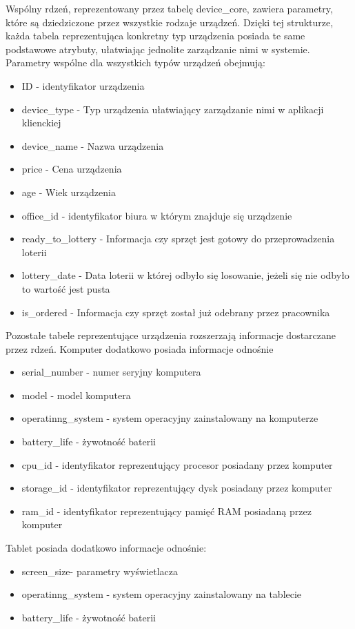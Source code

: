 Wspólny rdzeń, reprezentowany przez tabelę device\_core, zawiera parametry, które są dziedziczone przez wszystkie rodzaje urządzeń. Dzięki tej strukturze, każda tabela reprezentująca konkretny typ urządzenia posiada te same podstawowe atrybuty, ułatwiając jednolite zarządzanie nimi w systemie. Parametry wspólne dla wszystkich typów urządzeń obejmują:
\begin{itemize}
	\item ID - identyfikator urządzenia
	\item device\_type - Typ urządzenia ułatwiający zarządzanie nimi w aplikacji klienckiej
	\item device\_name - Nazwa urządzenia
	\item price - Cena urządzenia
	\item age - Wiek urządzenia
	\item office\_id - identyfikator biura w którym znajduje się urządzenie
	\item ready\_to\_lottery - Informacja czy sprzęt jest gotowy do przeprowadzenia loterii
	\item lottery\_date - Data loterii w której odbyło się losowanie, jeżeli się nie odbyło to wartość jest pusta
	\item is\_ordered - Informacja czy sprzęt został już odebrany przez pracownika
\end{itemize}

Pozostałe tabele reprezentujące urządzenia rozszerzają informacje dostarczane przez rdzeń. Komputer dodatkowo posiada informacje odnośnie
\begin{itemize}
	\item serial\_number - numer seryjny komputera
	\item model - model komputera
	\item operatinng\_system - system operacyjny zainstalowany na komputerze
	\item battery\_life - żywotność baterii
	\item cpu\_id - identyfikator reprezentujący procesor posiadany przez komputer
	\item storage\_id - identyfikator reprezentujący dysk posiadany przez komputer
	\item ram\_id - identyfikator reprezentujący pamięć RAM posiadaną przez komputer
\end{itemize}

Tablet posiada dodatkowo informacje odnośnie:
\begin{itemize}
	\item screen\_size- parametry wyświetlacza
	\item operatinng\_system - system operacyjny zainstalowany na tablecie
	\item battery\_life - żywotność baterii
\end{itemize}

